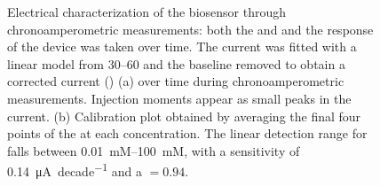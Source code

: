 \begin{figure}
    \centering
    \hfill
    \caption{Electrical characterization of the biosensor through chronoamperometric measurements: both the \vds{} and \vgs{} and the response of the device was taken over time. The current was fitted with a linear model from \SIrange{30}{60}{\min} and the baseline removed to obtain a corrected current (\idscorr{})
    (a) \idscorr{} over time during chronoamperometric measurements. Injection moments appear as small peaks in the current. 
    (b) Calibration plot obtained by averaging the final four points of the \idscorr{} at each concentration. The linear detection range for \amm{} falls between \SIrange{0.01}{100}{mM}, with a sensitivity of \SI{0.14}{\uA \per decade} and a \rsq{}$= 0.94$.}
    \label{fig:sensing_chronoamperometry}
\end{figure}


